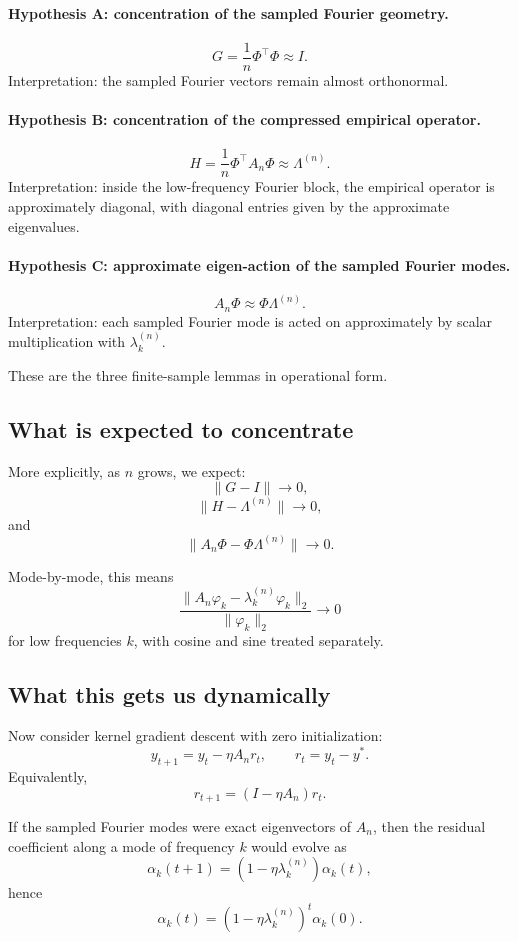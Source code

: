 \documentclass[11pt]{article}
\begin{document}
\paragraph{Hypothesis A: concentration of the sampled Fourier geometry.}
$$
	G=\frac{1}{n}\Phi^\top\Phi \approx I.
$$
Interpretation: the sampled Fourier vectors remain almost orthonormal.

\paragraph{Hypothesis B: concentration of the compressed empirical operator.}
$$
	H=\frac{1}{n}\Phi^\top A_n\Phi \approx \Lambda^{(n)}.
$$
Interpretation: inside the low-frequency Fourier block, the empirical operator is approximately diagonal, with diagonal entries given by the approximate eigenvalues.

\paragraph{Hypothesis C: approximate eigen-action of the sampled Fourier modes.}
$$
	A_n\Phi \approx \Phi\Lambda^{(n)}.
$$
Interpretation: each sampled Fourier mode is acted on approximately by scalar multiplication with $\lambda_k^{(n)}$.

These are the three finite-sample lemmas in operational form.

\subsection{What is expected to concentrate}

More explicitly, as $n$ grows, we expect:
$$
	\|G-I\|\to 0,
$$
$$
	\|H-\Lambda^{(n)}\|\to 0,
$$
and
$$
	\|A_n\Phi-\Phi\Lambda^{(n)}\|\to 0.
$$

Mode-by-mode, this means
$$
	\frac{\|A_n\varphi_k-\lambda_k^{(n)}\varphi_k\|_2}{\|\varphi_k\|_2}\to 0
$$
for low frequencies $k$, with cosine and sine treated separately.

\subsection{What this gets us dynamically}

Now consider kernel gradient descent with zero initialization:
$$
	y_{t+1}=y_t-\eta A_n r_t,
	\qquad
	r_t=y_t-y^*.
$$
Equivalently,
$$
	r_{t+1}=(I-\eta A_n)r_t.
$$

If the sampled Fourier modes were exact eigenvectors of $A_n$, then the residual coefficient along a mode of frequency $k$ would evolve as
$$
	\alpha_k(t+1)=(1-\eta\lambda_k^{(n)})\alpha_k(t),
$$
hence
$$
	\alpha_k(t)=(1-\eta\lambda_k^{(n)})^t\alpha_k(0).
$$
\end{document}
